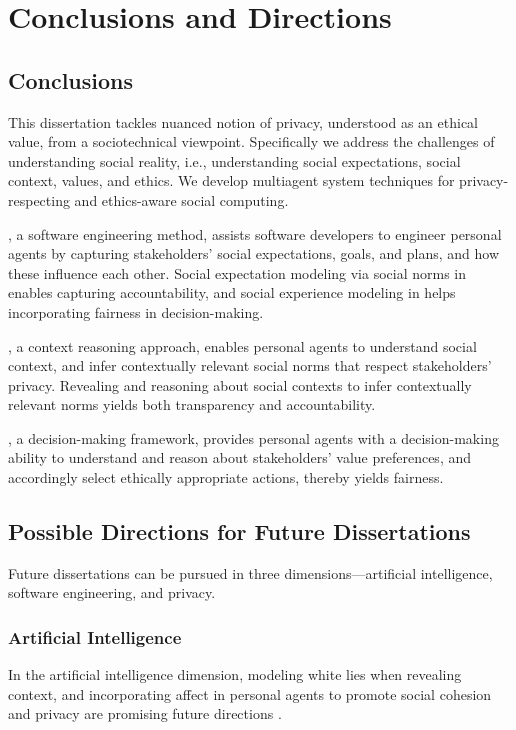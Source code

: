 \chapter{Conclusions and Directions}
\label{chap:conclusions}

\section{Conclusions}

This dissertation tackles nuanced notion of privacy, understood as an ethical value, from a sociotechnical viewpoint. 
Specifically we address the challenges of understanding social reality, i.e., understanding social expectations, social context, values, and ethics.
We develop multiagent system techniques for privacy-respecting and ethics-aware social computing.  

\frameworkA, a software engineering method, assists software developers to engineer personal agents by capturing stakeholders' social expectations, goals, and plans, and how these influence each other.  
Social expectation modeling via social norms in \frameworkA enables capturing accountability,
and social experience modeling in \frameworkA helps incorporating fairness in decision-making.

\frameworkB, a context reasoning approach, enables personal agents to understand social context, and infer contextually relevant social norms that respect stakeholders' privacy. 
Revealing and reasoning about social contexts to infer contextually relevant norms yields both transparency and accountability.

\frameworkAinur, a decision-making framework, provides personal agents with a decision-making ability to understand and reason about stakeholders' value preferences, 
and accordingly select ethically appropriate actions, thereby yields fairness.  

\section{Possible Directions for Future Dissertations}
Future dissertations can be pursued in three dimensions---artificial intelligence, software engineering, and privacy.

\subsection{Artificial Intelligence}
In the artificial intelligence dimension, modeling white lies when revealing context, and incorporating affect in personal agents to promote social cohesion and privacy are promising future directions \citep{IJCAI-18:Poros,Kalia+14:Emotions}.


